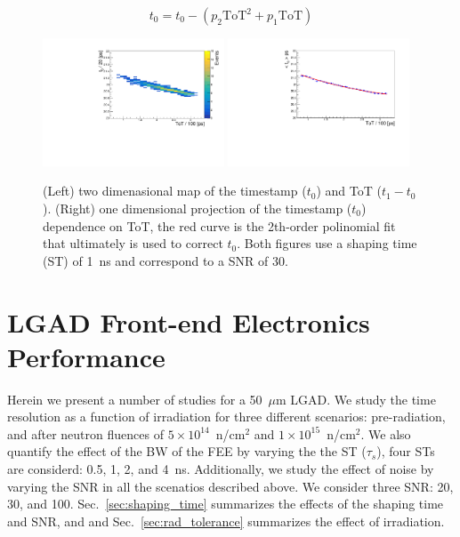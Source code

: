 \documentclass[preprint,1p]{elsarticle}
\begin{document}
\begin{equation}\label{eq:time_walk}
  t_{0} = t_{0}-(p_{2}\mathrm{ToT}^2+p_{1}\mathrm{ToT})
\end{equation}

\begin{figure}[htbp]
  \centering
  \includegraphics[width=0.48\textwidth]{figs/twoD_ToT_pre_rad_st_1ns_snr_30_le_tot_threshold_30mV_v2.pdf} \hfill
  \includegraphics[width=0.48\textwidth]{figs/oneD_ToT_pre_rad_st_1ns_snr_30_le_tot_threshold_30mV_v2.pdf}
  \caption{(Left) two dimenasional map of the timestamp ($t_{0}$) and ToT ($t_{1} - t_{0}$).
  (Right) one dimensional projection of the timestamp ($t_{0}$) dependence on ToT, the red curve is the 2th-order polinomial fit that
  ultimately is used to correct $t_{0}$. Both figures use a shaping time (ST) of 1~\si{ns} and correspond to a SNR of 30.}
  \label{fig:ToT}
\end{figure}




\section{LGAD Front-end Electronics Performance}\label{sec:results}

Herein we present a number of studies for a 50~$\mu$m LGAD. We study the time resolution as a function of irradiation
for three different scenarios: pre-radiation, and after neutron fluences of
 $5\times 10^{14}$~n/cm$^2$ and $1\times 10^{15}$~n/cm$^2$. We also quantify the effect of the BW of the FEE by varying the
 the ST ($\tau_{s}$), four STs are considerd: 0.5, 1, 2, and 4~\si{ns}. Additionally, we study the effect of noise by varying
 the SNR in all the scenatios described above. We consider three SNR: 20, 30, and 100.
 Sec.~\ref{sec:shaping_time} summarizes the effects of the shaping time and SNR, and
and Sec.~\ref{sec:rad_tolerance} summarizes the effect of irradiation.
\end{document}

